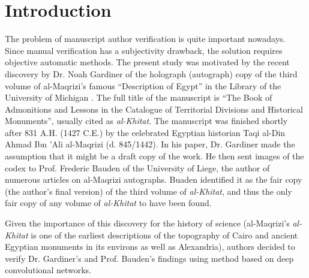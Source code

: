 \documentclass[a4paper,conference]{IEEEtran}
\begin{document}
\section{Introduction}
\label{sec:introduction}
The problem of manuscript author verification is quite important nowadays. Since manual verification has a subjectivity drawback, the solution requires objective automatic methods. The present study was motivated by the recent discovery by Dr. Noah Gardiner of the holograph (autograph) copy of the third volume of al-Maqrizi's famous ``Description of Egypt'' in the Library of the University of Michigan \cite{Noah}. The full title of the manuscript is ``The Book of Admonitions and Lessons in the Catalogue of Territorial Divisions and Historical Monuments'', usually cited as \textit{al-Khitat}. The manuscript was finished shortly after 831 A.H. (1427 C.E.) by the celebrated Egyptian historian Taqi al-Din Ahmad Ibn 'Ali al-Maqrizi (d. 845/1442). In his paper, Dr. Gardiner made the assumption that it might be a draft copy of the work. He then sent images of the codex to Prof. Frederic Bauden of the University of Liege, the author of numerous articles on al-Maqrizi autographs. Buaden identified it as the fair copy (the author's final version) of the third volume of \textit{al-Khitat}, and thus the only fair copy of any volume of \textit{al-Khitat} to have been found.

Given the importance of this discovery for the history of science (al-Maqrizi's \textit{al-Khitat} is one of the earliest descriptions of the topography of Cairo and ancient Egyptian monuments in its environs as well as Alexandria), authors decided to verify Dr. Gardiner's and Prof. Bauden's findings using method based on deep convolutional networks.
\end{document}
